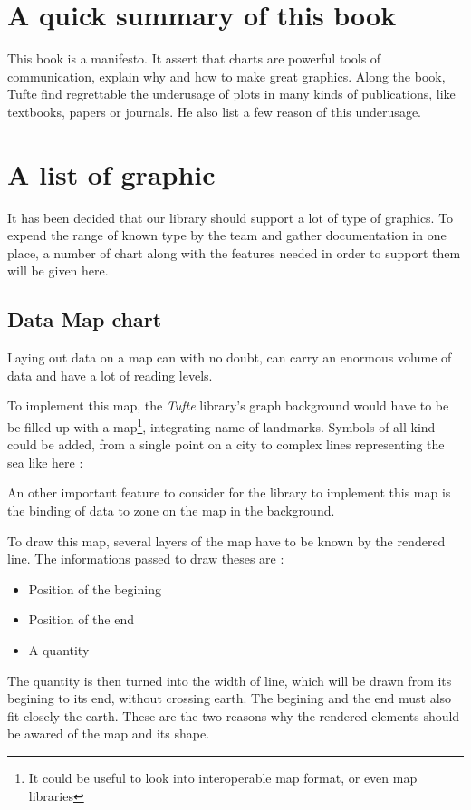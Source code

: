 \section{A quick summary of this book}
This book is a manifesto. It assert that charts are powerful tools of communication, explain why and how to make great graphics.
Along the book, Tufte find regrettable the underusage of plots in many kinds of publications, like textbooks, papers or journals. He also list a few reason of this underusage.

\section{A list of graphic}
It has been decided that our library should support a lot of type of graphics. To expend the range of known type by the team and gather documentation in one place, a number of chart along with the features needed in order to support them will be given here.

\subsection{Data Map chart}
Laying out data on a map can with no doubt, can carry an enormous volume of data and have a lot of reading levels.

To implement this map, the \textit{Tufte} library's graph background would have to be be filled up with a map\footnote{It could be useful to look into interoperable map format, or even map libraries}, integrating name of landmarks. Symbols of all kind could be added, from a single point on a city to complex lines representing the sea like here :

An other important feature to consider for the library to implement this map is the binding of data to zone on the map in the background.

To draw this map, several layers of the map have to be known by the rendered line. The informations passed to draw theses are :
\begin{itemize}
\item Position of the begining
\item Position of the end
\item A quantity
\end{itemize}
The quantity is then turned into the width of line, which will be drawn from its begining to its end, without crossing earth.
The begining and the end must also fit closely the earth. These are the two reasons why the rendered elements should be awared of the map and its shape.


